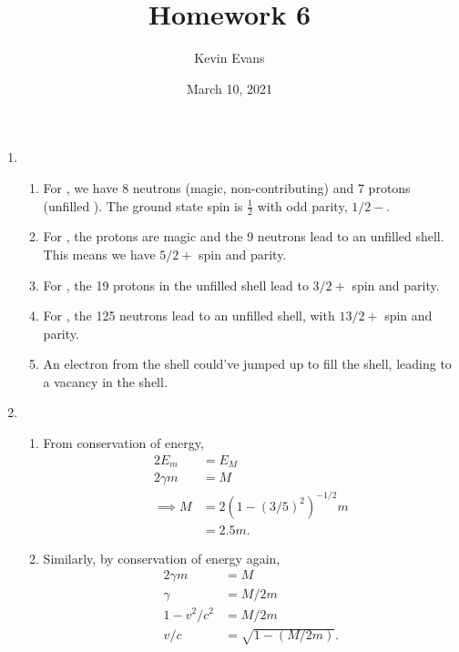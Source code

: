 \documentclass{homework}
\title{Homework 6}
\author{Kevin Evans}
\date{March 10, 2021}
\begin{document}
	\maketitle
	\begin{enumerate}
		\item \begin{enumerate}
			\item For , we have 8 neutrons (magic, non-contributing) and 7 protons (unfilled ). The ground state spin is $\frac{1}{2}$ with odd parity, $\boxed{1/2-}$.
			
			\item For , the protons are magic and the 9 neutrons lead to an unfilled  shell. This means we have $\boxed{5/2+}$ spin and parity.
			
			\item For , the 19 protons in the unfilled  shell lead to $\boxed{3/2+}$ spin and parity.
			
			\item For , the 125 neutrons lead to an unfilled  shell, with $\boxed{13/2+}$ spin and parity.
			
			\item An electron from the  shell could've jumped up to fill the  shell, leading to a vacancy in the  shell.
		\end{enumerate}
	
		\item \begin{enumerate}
			\item From conservation of energy, \begin{align*}
				2 E_{m} & = E_M \\
				2 \gamma m & = M \\
				\implies M & = 2 \left( 1 - (3/5)^2 \right)^{-1/2} m \\
					& = 2.5 m.
			\end{align*}
		
			\item Similarly, by conservation of energy again, \begin{align*}
				2 \gamma m & = M \\
				\gamma & = M / 2 m \\
				1 - v^2 / c^2 & = M / 2 m \\
				v/c & = \sqrt{ 1 - (M / 2m) }.
			\end{align*}
		

\end{enumerate}
\end{enumerate}
\end{document}
